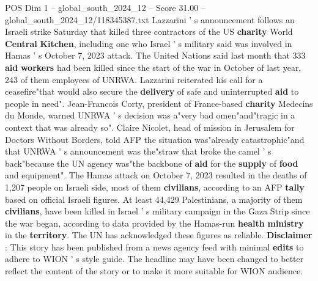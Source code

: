 \begin{textsample}{POS Dim 1 – global\_south\_2024\_12 – Score 31.00 – global\_south\_2024\_12/118345387.txt}
Lazzarini ' s announcement follows an Israeli strike Saturday that killed three contractors of the US \textbf{charity} World \textbf{Central} \textbf{Kitchen}, including one who Israel ' s military said was involved in Hamas ' s October 7, 2023 attack.
The United Nations said last month that 333 \textbf{aid} \textbf{workers} had been killed since the start of the war in October of last year, 243 of them employees of UNRWA.
Lazzarini reiterated his call for a ceasefire"that would also secure the \textbf{delivery} of safe and uninterrupted \textbf{aid} to people in need".
Jean-Francois Corty, president of France-based \textbf{charity} Medecins du Monde, warned UNRWA ' s decision was a"very bad omen"and"tragic in a context that was already so".
Claire Nicolet, head of mission in Jerusalem for Doctors Without Borders, told AFP the situation was"already catastrophic"and that UNRWA ' s announcement was the"straw that broke the camel ' s back"because the UN agency was"the backbone of \textbf{aid} for the \textbf{supply} of \textbf{food} and equipment".
The Hamas attack on October 7, 2023 resulted in the deaths of 1,207 people on Israeli side, most of them \textbf{civilians}, according to an AFP \textbf{tally} based on official Israeli figures.
At least 44,429 Palestinians, a majority of them \textbf{civilians}, have been killed in Israel ' s military campaign in the Gaza Strip since the war began, according to data provided by the Hamas-run \textbf{health} \textbf{ministry} in the \textbf{territory}.
The UN has acknowledged these figures as reliable. \textbf{Disclaimer} : This story has been published from a news agency feed with minimal \textbf{edits} to adhere to WION ' s style guide.
The headline may have been changed to better reflect the content of the story or to make it more suitable for WION audience.

\end{textsample}
